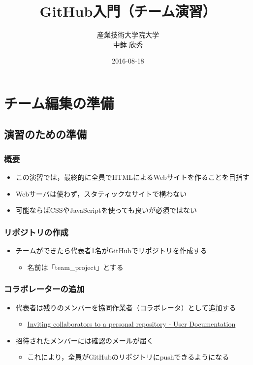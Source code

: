 \documentclass[a4paper,twoside,twocolumn]{bxjsarticle}
\author{産業技術大学院大学\\ 中鉢 欣秀}
\date{2016-08-18}
\title{GitHub入門（チーム演習）}
\begin{document}
\maketitle

\section{チーム編集の準備}
\label{sec-1}
\subsection{演習のための準備}
\label{sec-1-1}
\subsubsection{概要}
\label{sec-1-1-1}
\begin{itemize}
\item この演習では，最終的に全員でHTMLによるWebサイトを作ることを目指す
\item Webサーバは使わず，スタティックなサイトで構わない
\item 可能ならばCSSやJavaScriptを使っても良いが必須ではない
\end{itemize}

\subsubsection{リポジトリの作成}
\label{sec-1-1-2}
\begin{itemize}
\item チームができたら代表者1名がGitHubでリポジトリを作成する
\begin{itemize}
\item 名前は「team\_project」とする
\end{itemize}
\end{itemize}

\subsubsection{コラボレーターの追加}
\label{sec-1-1-3}
\begin{itemize}
\item 代表者は残りのメンバーを協同作業者（コラボレータ）として追加する
\begin{itemize}
\item \href{https://help.github.com/articles/inviting-collaborators-to-a-personal-repository/}{Inviting collaborators to a personal repository - User Documentation}
\end{itemize}
\item 招待されたメンバーには確認のメールが届く
\begin{itemize}
\item これにより，全員がGitHubのリポジトリにpushできるようになる
\end{itemize}
\end{itemize}
\end{document}
